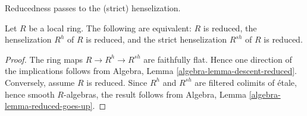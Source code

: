\begin{lemma}
\label{lemma-henselization-reduced}
\begin{slogan}
Reducedness passes to the (strict) henselization.
\end{slogan}
Let $R$ be a local ring.
The following are equivalent: $R$ is reduced,
the henselization $R^h$ of $R$ is reduced, and
the strict henselization $R^{sh}$ of $R$ is reduced.
\end{lemma}

\begin{proof}
The ring maps $R \to R^h \to R^{sh}$ are faithfully flat.
Hence one direction of the implications follows from
Algebra, Lemma \ref{algebra-lemma-descent-reduced}.
Conversely, assume $R$ is reduced. Since $R^h$ and $R^{sh}$
are filtered colimits of \'etale, hence smooth $R$-algebras, the
result follows from
Algebra, Lemma \ref{algebra-lemma-reduced-goes-up}.
\end{proof}
